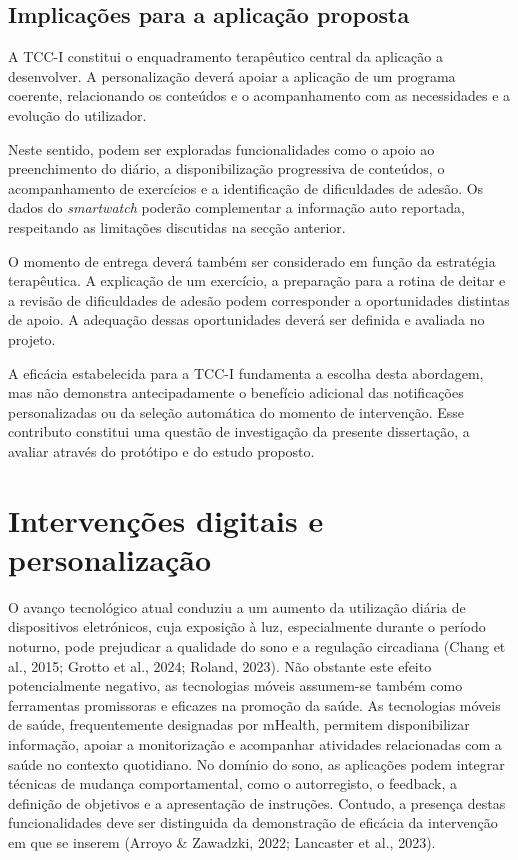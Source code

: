 \subsection{Implicações para a aplicação proposta}

A TCC-I constitui o enquadramento terapêutico central da aplicação a desenvolver. A personalização deverá apoiar a aplicação de um programa coerente, relacionando os conteúdos e o acompanhamento com as necessidades e a evolução do utilizador.

Neste sentido, podem ser exploradas funcionalidades como o apoio ao preenchimento do diário, a disponibilização progressiva de conteúdos, o acompanhamento de exercícios e a identificação de dificuldades de adesão. Os dados do \textit{smartwatch} poderão complementar a informação auto reportada, respeitando as limitações discutidas na secção anterior.

O momento de entrega deverá também ser considerado em função da estratégia terapêutica. A explicação de um exercício, a preparação para a rotina de deitar e a revisão de dificuldades de adesão podem corresponder a oportunidades distintas de apoio. A adequação dessas oportunidades deverá ser definida e avaliada no projeto.

A eficácia estabelecida para a TCC-I fundamenta a escolha desta abordagem, mas não demonstra antecipadamente o benefício adicional das notificações personalizadas ou da seleção automática do momento de intervenção. Esse contributo constitui uma questão de investigação da presente dissertação, a avaliar através do protótipo e do estudo proposto.


\section{Intervenções digitais e personalização}
\label{sec:chap2_digitalInterventions}

O avanço tecnológico atual conduziu a um aumento da utilização diária de dispositivos eletrónicos, cuja exposição à luz, especialmente durante o período noturno, pode prejudicar a qualidade do sono e a regulação circadiana (Chang et al., 2015; Grotto et al., 2024; Roland, 2023). Não obstante este efeito potencialmente negativo, as tecnologias móveis assumem-se também como ferramentas promissoras e eficazes na promoção da saúde. As tecnologias móveis de saúde, frequentemente designadas por mHealth, permitem disponibilizar informação, apoiar a monitorização e acompanhar atividades relacionadas com a saúde no contexto quotidiano. No domínio do sono, as aplicações podem integrar técnicas de mudança comportamental, como o autorregisto, o feedback, a definição de objetivos e a apresentação de instruções. Contudo, a presença destas funcionalidades deve ser distinguida da demonstração de eficácia da intervenção em que se inserem (Arroyo \& Zawadzki, 2022; Lancaster et al., 2023).

